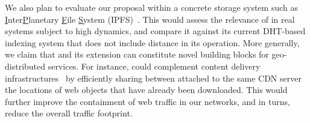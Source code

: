 We also plan to evaluate our proposal within a concrete storage system
such as \underline{I}nter\underline{P}lanetary \underline{F}ile
\underline{S}ystem (IPFS)~\cite{ipfs}. This would assess the relevance
of \NAME in real systems subject to high dynamics, and compare it
against its current DHT-based indexing system that does not include
distance in its operation. More generally, we claim that \NAME and its
extension can constitute novel building blocks for geo-distributed
services.  For instance, \NAME could complement content delivery
infrastructures~\cite{triukose2011measuring} by efficiently sharing
between \processes attached to the same CDN server the locations of
web objects that have already been downloaded. This would further
improve the containment of web traffic in our networks, and in turns,
reduce the overall traffic footprint.
%


